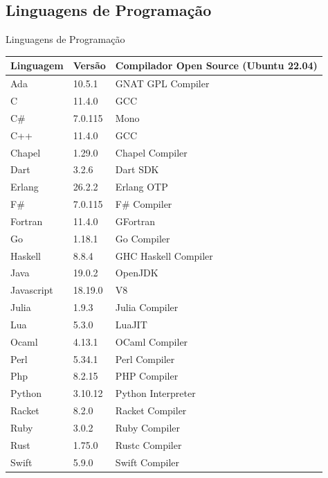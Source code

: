\subsection{Linguagens de Programação}
\begin{frame}{Linguagens de Programação}
    \begin{table}[h]
        \centering
        \fontsize{6}{7}\selectfont
        \begin{tabular}{l|l|l}
            \textbf{Linguagem} & \textbf{Versão} & \textbf{Compilador Open Source (Ubuntu 22.04)}\\
            \hline
            Ada & 10.5.1 & GNAT GPL Compiler \\
            \hline
            C & 11.4.0 & GCC \\
            \hline
            C\# & 7.0.115 & Mono \\
            \hline
            C++ & 11.4.0 & GCC \\
            \hline
            Chapel & 1.29.0 & Chapel Compiler \\
            \hline
            Dart & 3.2.6 & Dart SDK \\
            \hline
            Erlang &  26.2.2 & Erlang OTP \\
            \hline
            F\# & 7.0.115 & F\# Compiler \\
            \hline
            Fortran & 11.4.0 & GFortran \\
            \hline
            Go & 1.18.1 & Go Compiler \\
            \hline
            Haskell & 8.8.4 & GHC Haskell Compiler \\
            \hline
            Java & 19.0.2 & OpenJDK \\
            \hline
            Javascript & 18.19.0 & V8 \\
            \hline
            Julia & 1.9.3 & Julia Compiler \\
            \hline
            Lua & 5.3.0 & LuaJIT \\
            \hline
            Ocaml & 4.13.1 & OCaml Compiler \\
            \hline
            Perl & 5.34.1 & Perl Compiler \\
            \hline
            Php & 8.2.15 & PHP Compiler \\
            \hline
            Python & 3.10.12 & Python Interpreter \\
            \hline
            Racket & 8.2.0 & Racket Compiler \\
            \hline
            Ruby & 3.0.2 & Ruby Compiler \\
            \hline
            Rust & 1.75.0 & Rustc Compiler \\
            \hline
            Swift & 5.9.0 & Swift Compiler \\
        \end{tabular}
    \end{table}
\end{frame}
